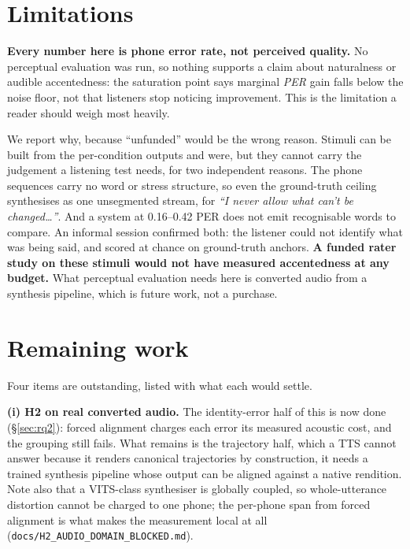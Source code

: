 \documentclass[9pt,a4paper,twocolumn]{article}
\begin{document}
\section{Limitations}

\textbf{Every number here is phone error rate, not perceived quality.} No
perceptual evaluation was run, so nothing supports a claim about naturalness or
audible accentedness: the saturation point says marginal \emph{PER} gain falls
below the noise floor, not that listeners stop noticing improvement. This is
the limitation a reader should weigh most heavily.

We report why, because ``unfunded'' would be the wrong reason. Stimuli can be
built from the per-condition outputs and were, but they cannot carry the
judgement a listening test needs, for two independent reasons. The phone
sequences carry no word or stress structure, so even the ground-truth ceiling
synthesises as one unsegmented stream, 
for \emph{``I never allow what can't be changed\ldots''}. And a system at
0.16--0.42 PER does not emit recognisable words to compare. An informal session
confirmed both: the listener could not identify what was being said, and scored
at chance on ground-truth anchors. \textbf{A funded rater study on these
stimuli would not have measured accentedness at any budget.} What perceptual
evaluation needs here is converted audio from a synthesis pipeline, which is
future work, not a purchase.

\section{Remaining work}
\label{sec:remaining}

Four items are outstanding, listed with what each would settle.

\textbf{(i) H2 on real converted audio.} The identity-error half of this is now
done (\S\ref{sec:rq2}): forced alignment charges each error its measured
acoustic cost, and the grouping still fails. What remains is the trajectory
half, which a TTS cannot answer because it renders canonical trajectories by
construction, it needs a trained synthesis pipeline whose output can be
aligned against a native rendition. Note also that a VITS-class synthesiser is
globally coupled, so whole-utterance distortion cannot be charged to one phone;
the per-phone span from forced alignment is what makes the measurement local at
all (\texttt{docs/H2\_AUDIO\_DOMAIN\_BLOCKED.md}).
\end{document}
